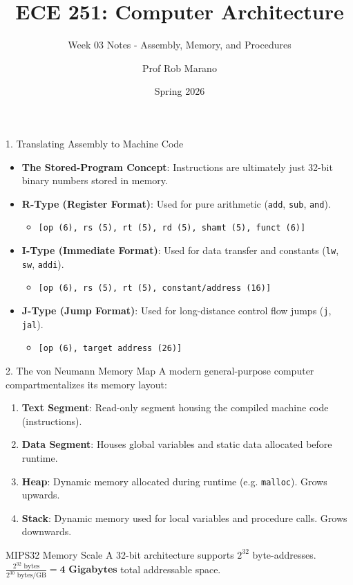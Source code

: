 \documentclass[aspectratio=169]{beamer}
\title{ECE 251: Computer Architecture}
\subtitle{Week 03 Notes - Assembly, Memory, and Procedures}
\author{Prof Rob Marano}
\date{Spring 2026}
\begin{document}
\frame{\titlepage}

\begin{frame}{1. Translating Assembly to Machine Code}
\begin{itemize}
    \item \textbf{The Stored-Program Concept}: Instructions are ultimately just 32-bit binary numbers stored in memory.
    \item \textbf{R-Type (Register Format)}: Used for pure arithmetic (\texttt{add}, \texttt{sub}, \texttt{and}).
    \begin{itemize}
        \item \texttt{[op (6), rs (5), rt (5), rd (5), shamt (5), funct (6)]}
    \end{itemize}
    \vspace{0.2cm}
    \item \textbf{I-Type (Immediate Format)}: Used for data transfer and constants (\texttt{lw}, \texttt{sw}, \texttt{addi}).
    \begin{itemize}
        \item \texttt{[op (6), rs (5), rt (5), constant/address (16)]}
    \end{itemize}
    \vspace{0.2cm}
    \item \textbf{J-Type (Jump Format)}: Used for long-distance control flow jumps (\texttt{j}, \texttt{jal}).
    \begin{itemize}
        \item \texttt{[op (6), target address (26)]}
    \end{itemize}
\end{itemize}
\end{frame}

\begin{frame}{2. The von Neumann Memory Map}
A modern general-purpose computer compartmentalizes its memory layout:
\vspace{0.2cm}
\begin{enumerate}
    \item \textbf{Text Segment}: Read-only segment housing the compiled machine code (instructions).
    \item \textbf{Data Segment}: Houses global variables and static data allocated before runtime.
    \item \textbf{Heap}: Dynamic memory allocated during runtime (e.g. \texttt{malloc}). Grows upwards.
    \item \textbf{Stack}: Dynamic memory used for local variables and procedure calls. Grows downwards.
\end{enumerate}
\vspace{0.2cm}
\begin{block}{MIPS32 Memory Scale}
A 32-bit architecture supports $2^{32}$ byte-addresses. $\frac{2^{32} \text{ bytes}}{2^{30} \text{ bytes/GB}} = \textbf{4 Gigabytes}$ total addressable space.
\end{block}
\end{frame}
\end{document}
